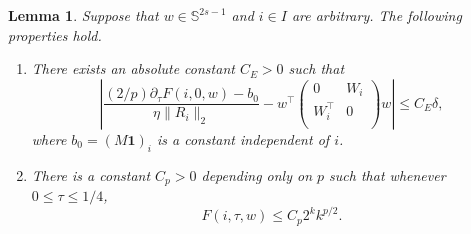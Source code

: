 \documentclass[11pt]{article}
\newtheorem{lemma}[theorem]{Lemma}
\theoremstyle{remark}
\theoremstyle{definition}
\newcommand{\Sph}{\mathbb{S}}
\begin{document}
\begin{lemma}\label{lem:F_properties}
Suppose that $w\in \Sph^{2s-1}$ and $i\in I$ are arbitrary. The following properties hold.
\begin{enumerate}[label=(\roman*)]
	\item There exists an absolute constant $C_E > 0$ such that
	\[
		\left|	\frac{(2/p)\partial_\tau F(i,0,w) - b_0}{\eta\|R_i\|_2} 
		- w^\top \begin{pmatrix}
			        0 & W_i \\
			        W_i^\top & 0 \\
				 \end{pmatrix} w \right|
		\le C_E\delta,
	\]
	where $b_0 = (M\mathbf{1})_i$ is a constant independent of $i$.
	
	\item There is a constant $C_p > 0$ depending only on $p$ such that whenever $0\leq \tau \leq 1/4$,
	\[
		F(i,\tau,w)	\le C_p 2^k k^{p/2}.
	\]
\end{enumerate}
\end{lemma}
\end{document}
